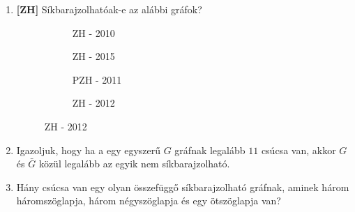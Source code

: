 \documentclass[a4paper, 12pt]{article}
\begin{document}
\begin{enumerate}
            \item \textbf{[ZH]} Síkbarajzolhatóak-e az alábbi gráfok?
            \begin{figure}[!ht]
                \centering
                \begin{subfigure}{0.2\textwidth}
                    \centering				
                    
                    \caption{ZH - 2010}
                \end{subfigure}
                \begin{subfigure}{0.2\textwidth}
                    \centering					
                    
                    \caption{ZH - 2015}
                \end{subfigure}
                \begin{subfigure}{0.25\textwidth}
                    \centering					
                    
                    \caption{PZH - 2011}
                \end{subfigure}
                \begin{subfigure}{0.2\textwidth}
                    \centering					
                    
                    \caption{ZH - 2012}
                \end{subfigure}
            \end{figure}
            \item Igazoljuk, hogy ha a egy egyszerű $G$ gráfnak legalább $11$ csúcsa van, akkor $G$ és $\bar{G}$ közül legalább az egyik nem síkbarajzolható.
            \item Hány csúcsa van egy olyan összefüggő síkbarajzolható gráfnak, aminek három háromszöglapja, három négyszöglapja és egy ötszöglapja van?
        \end{enumerate}
    
    
\end{document}
